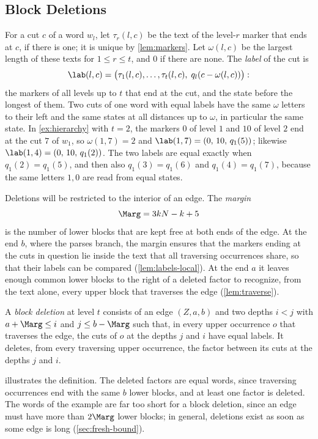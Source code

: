 

\subsection{Block Deletions}\label{sec:fresh-deletion}

For a cut $c$ of a word $w_l$, let $\tau_r(l,c)$ be the text of the
level-$r$ marker that ends at $c$, if there is one; it is unique by
\cref{lem:markers}. Let $\omega(l,c)$ be the largest length of these texts
for $1\le r\le t$, and $0$ if there are none. The \emph{label} of the cut is
\[
  \lab(l,c)=\bigl(\tau_1(l,c),\dots,\tau_t(l,c),\;q_l(c-\omega(l,c))\bigr):
\]
the markers of all levels up to $t$ that end at the cut, and the state
before the longest of them. Two cuts of one word with equal labels have the
same $\omega$ letters to their left and the same states at all distances up
to $\omega$, in particular the same state. In \cref{ex:hierarchy} with
$t=2$, the markers $0$ of level $1$ and $10$ of level $2$ end at the cut $7$
of $w_1$, so $\omega(1,7)=2$ and $\lab(1,7)=(0,\,10,\,q_1(5))$; likewise
$\lab(1,4)=(0,\,10,\,q_1(2))$. The two labels are equal exactly when
$q_1(2)=q_1(5)$, and then also $q_1(3)=q_1(6)$ and $q_1(4)=q_1(7)$, because
the same letters $1,0$ are read from equal states.

Deletions will be restricted to the interior of an edge. The \emph{margin}
\[
  \Marg=3kN-k+5
\]
is the number of lower blocks that are kept free at both ends of the edge.
At the end $b$, where the parses branch, the margin ensures that the markers
ending at the cuts in question lie inside the text that all traversing
occurrences share, so that their labels can be compared
(\cref{lem:labels-local}). At the end $a$ it leaves enough common lower
blocks to the right of a deleted factor to recognize, from the text alone,
every upper block that traverses the edge (\cref{lem:traverse}).

\begin{definition}\label{def:block-deletion}
A \emph{block deletion} at level $t$ consists of an edge $(Z,a,b)$ and two
depths $i<j$ with $a+\Marg\le i$ and $j\le b-\Marg$ such that, in every upper
occurrence $o$ that traverses the edge, the cuts of $o$ at the depths $j$ and
$i$ have equal labels. It deletes, from every traversing upper occurrence,
the factor between its cuts at the depths $j$ and $i$.
\end{definition}

 illustrates the definition. The deleted factors are
equal words, since traversing occurrences end with the same $b$ lower
blocks, and at least one factor is deleted. The words of the example are
far too short for a block deletion, since an edge must have more than
$2\Marg$ lower blocks; in general, deletions exist as soon as some edge is
long (\cref{sec:fresh-bound}).

